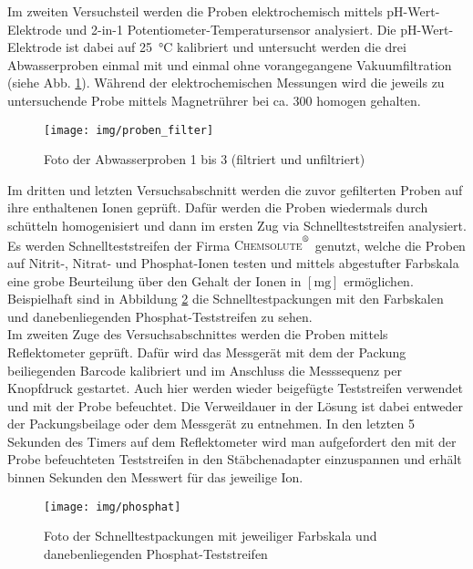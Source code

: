
\newpage

Im zweiten Versuchsteil werden die Proben elektrochemisch mittels pH-Wert-Elektrode und 2-in-1 Potentiometer-Temperatursensor analysiert. Die pH-Wert-Elektrode ist dabei auf \SI{25}{\celsius} kalibriert und untersucht werden die drei Abwasserproben einmal mit und einmal ohne vorangegangene Vakuumfiltration (siehe Abb. \ref{fig:proben_filter}). \linebreak Während der elektrochemischen Messungen wird die jeweils zu untersuchende Probe mittels Magnetrührer bei ca. \SI{300}{\rpm} homogen gehalten.

\begin{figure}[h!]
	\centering
	\texttt{[image: img/proben\_filter]}
	\caption{Foto der Abwasserproben 1 bis 3 (filtriert und unfiltriert)}
	\label{fig:proben_filter}
\end{figure}
\FloatBarrier

Im dritten und letzten Versuchsabschnitt werden die zuvor gefilterten Proben auf ihre enthaltenen Ionen geprüft. Dafür werden die Proben wiedermals durch schütteln homogenisiert und dann im ersten Zug via Schnellteststreifen analysiert. Es werden Schnellteststreifen der Firma \textsc{Chemsolute$^{\textsuperscript{\textregistered}}$} genutzt, welche die Proben auf Nitrit-, Nitrat- und Phosphat-Ionen testen und mittels abgestufter Farbskala eine grobe Beurteilung über den Gehalt der Ionen in $\left[\si{\milli \gram}\right]$ ermöglichen. Beispielhaft sind in Abbildung \ref{fig:phosphat_test} die Schnelltestpackungen mit den Farbskalen und danebenliegenden Phosphat-Teststreifen zu sehen.\\
Im zweiten Zuge des Versuchsabschnittes werden die Proben mittels Reflektometer geprüft. Dafür wird das Messgerät mit dem der Packung beiliegenden Barcode kalibriert und im Anschluss die Messsequenz per Knopfdruck gestartet. Auch hier werden wieder beigefügte Teststreifen verwendet und mit der Probe befeuchtet. Die Verweildauer in der Lösung ist dabei entweder der Packungsbeilage oder dem Messgerät zu entnehmen. In den letzten 5 Sekunden des Timers auf dem Reflektometer wird man aufgefordert den mit der Probe befeuchteten Teststreifen in den Stäbchenadapter einzuspannen und erhält binnen Sekunden den Messwert für das jeweilige Ion.
\begin{figure}[h!]
	\centering
	\texttt{[image: img/phosphat]}
	\caption{Foto der Schnelltestpackungen mit jeweiliger Farbskala und danebenliegenden Phosphat-Teststreifen}
	\label{fig:phosphat_test}
\end{figure}
\FloatBarrier
